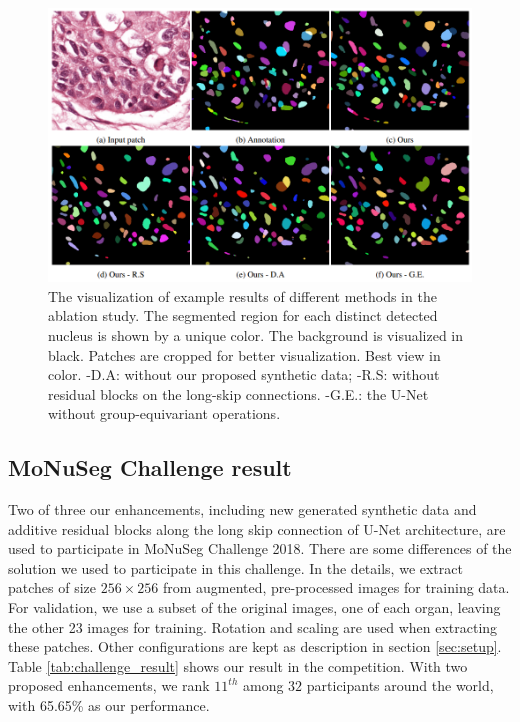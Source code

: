 \begin{figure}[thb]
    \centering
    \includegraphics[width=\textwidth]{resources/5_ablation.png}
    \caption{The visualization of example results of different methods in the ablation study.
    The segmented region for each distinct detected nucleus is shown by a unique color.
    The background is visualized in black.
    Patches are cropped for better visualization.
    Best view in color.
    -D.A: without our proposed synthetic data; -R.S: without residual blocks on the long-skip connections.
-G.E.: the U-Net without group-equivariant operations.}\label{fig:vis_result}
\end{figure}



\subsection{MoNuSeg Challenge result}

Two of three our enhancements, including new generated synthetic data and additive residual blocks along the long skip connection of U-Net architecture, are used to participate in MoNuSeg Challenge 2018. There are some differences of the solution we used to participate in this challenge. In the details, we extract patches of size $256 \times 256$ from augmented, pre-processed images for training data. For validation, we use a subset of the original images, one of each organ, leaving the other 23 images for training. Rotation and scaling are used when extracting these patches. Other configurations are kept as description in section \ref{sec:setup}. Table \ref{tab:challenge_result} shows our result in the competition. With two proposed enhancements, we rank $11^{th}$ among $32$ participants around the world, with 65.65\% as our performance.

